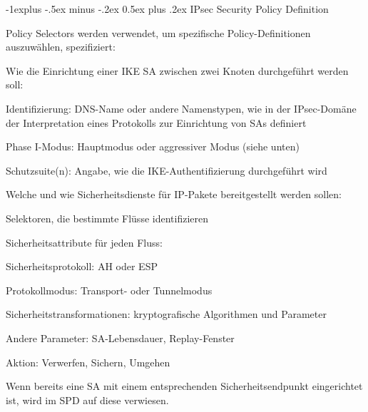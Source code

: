 \documentclass[a4paper]{article}
\makeatletter
\renewcommand{\subsection}{\@startsection{subsection}{2}{0mm}%
 {-1explus -.5ex minus -.2ex}%
 {0.5ex plus .2ex}%
 {\normalfont\normalsize\bfseries}}
\makeatother
\begin{document}
\begin{multicols}{3}
      \subsection{IPsec Security Policy Definition}
      \begin{itemize*}
            \item Policy Selectors werden verwendet, um spezifische Policy-Definitionen auszuwählen, spezifiziert:
            \begin{itemize*}
                  \item Wie die Einrichtung einer IKE SA zwischen zwei Knoten durchgeführt werden soll:
                  \begin{itemize*}
                        \item Identifizierung: DNS-Name oder andere Namenstypen, wie in der IPsec-Domäne der Interpretation eines Protokolls zur Einrichtung von SAs definiert
                        \item Phase I-Modus: Hauptmodus oder aggressiver Modus (siehe unten)
                        \item Schutzsuite(n): Angabe, wie die IKE-Authentifizierung durchgeführt wird
                  \end{itemize*}
                  \item Welche und wie Sicherheitsdienste für IP-Pakete bereitgestellt werden sollen:
                  \begin{itemize*}
                        \item Selektoren, die bestimmte Flüsse identifizieren
                        \item Sicherheitsattribute für jeden Fluss:
                        \item Sicherheitsprotokoll: AH oder ESP
                        \item Protokollmodus: Transport- oder Tunnelmodus
                        \item Sicherheitstransformationen: kryptografische Algorithmen und Parameter
                        \item Andere Parameter: SA-Lebensdauer, Replay-Fenster
                        \item Aktion: Verwerfen, Sichern, Umgehen
                  \end{itemize*}
            \end{itemize*}
            \item Wenn bereits eine SA mit einem entsprechenden Sicherheitsendpunkt eingerichtet ist, wird im SPD auf diese verwiesen.
      \end{itemize*}


\end{multicols}
\end{document}
